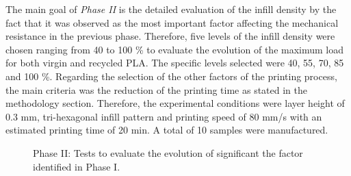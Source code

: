 \documentclass[]{interact}
\theoremstyle{plain}%
\theoremstyle{definition}
\theoremstyle{remark}
\begin{document}
The main goal of \emph{Phase II} is the detailed evaluation of the
infill density by the fact that it was observed as the most important
factor affecting the mechanical resistance in the previous phase.
Therefore, five levels of the infill density were chosen ranging from 40
to 100 \% to evaluate the evolution of the maximum load for both virgin
and recycled PLA. The specific levels selected were 40, 55, 70, 85 and
100 \%. Regarding the selection of the other factors of the printing
process, the main criteria was the reduction of the printing time as
stated in the methodology section. Therefore, the experimental
conditions were layer height of 0.3 mm, tri-hexagonal infill pattern and
printing speed of 80 mm/s with an estimated printing time of 20 min. A
total of 10 samples were manufactured.

\begin{figure}[!t]
\centering
{}
\hfill
{}
\caption{Phase II: Tests to evaluate the evolution of significant the factor identified in Phase I.}
\end{figure}
\end{document}
